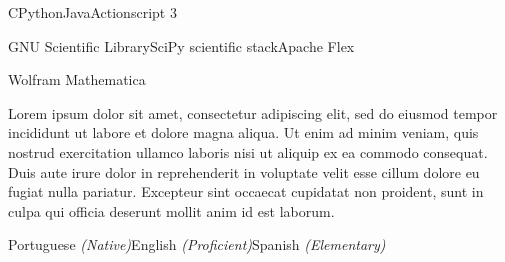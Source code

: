 \begin{cvrows}
	{C\dotsep Python\dotsep Java\dotsep Actionscript 3}
	
	{GNU Scientific Library\dotsep SciPy scientific stack\dotsep Apache Flex}
	
	{Wolfram Mathematica}
	
	{Lorem ipsum dolor sit amet, consectetur adipiscing elit, sed do eiusmod tempor incididunt ut labore et dolore magna aliqua. Ut enim ad minim veniam, quis nostrud exercitation ullamco laboris nisi ut aliquip ex ea commodo consequat. Duis aute irure dolor in reprehenderit in voluptate velit esse cillum dolore eu fugiat nulla pariatur. Excepteur sint occaecat cupidatat non proident, sunt in culpa qui officia deserunt mollit anim id est laborum.
	}
	
	{Portuguese \textit{(Native)}\dotsep English \textit{(Proficient)}\dotsep Spanish \textit{(Elementary)}}
	
\end{cvrows}

\clearsection
